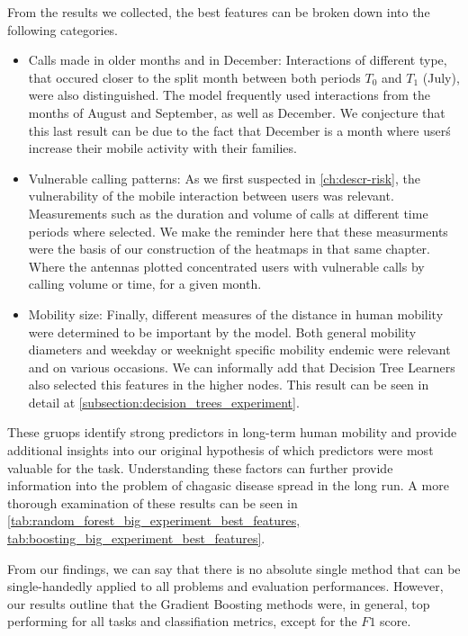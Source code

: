 From the results we collected, the best features can be broken down into the following categories.

\begin{itemize}

    \item Calls made in older months and in December: Interactions of different type, that occured closer to the split month between both periods $T_0$ and $T_1$ (July), were also distinguished.
    The model frequently used interactions from the months of August and September, as well as December.
    We conjecture that this last result can be due to the fact that December is a month where user\'s increase their mobile activity with their families.

    \item Vulnerable calling patterns: As we first suspected in \cref{ch:descr-risk}, the vulnerability of the mobile interaction between users was relevant.
    Measurements such as the duration and volume of calls at different time periods where selected.
    We make the reminder here that these measurments were the basis of our construction of the heatmaps in that same chapter.
    Where the antennas plotted concentrated users with vulnerable calls by calling volume or time, for a given month.

    \item Mobility size: Finally, different measures of the distance in human mobility were determined to be important by the model. Both general mobility diameters and weekday or weeknight specific mobility endemic were relevant and on various occasions.
    We can informally add that Decision Tree Learners also selected this features in the higher nodes.
    This result can be seen in detail at \cref{subsection:decision_trees_experiment}.

\end{itemize}

These gruops identify strong predictors in long-term human mobility and provide additional insights into our original hypothesis of which predictors were most valuable for the task.
Understanding these factors can further provide information into the problem of chagasic disease spread in the long run.
A more thorough examination of these results can be seen in \cref{tab:random_forest_big_experiment_best_features, tab:boosting_big_experiment_best_features}.




From our findings, we can say that there is no absolute single method that can be single-handedly applied to all problems and evaluation performances.
However, our results outline that the Gradient Boosting methods were, in general, top performing for all tasks and classifiation metrics, except for the $F1$ score.

